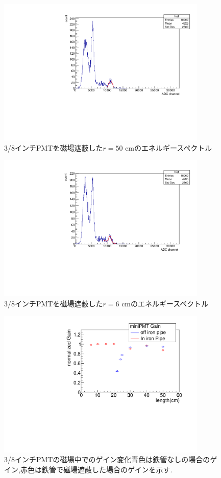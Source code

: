 \begin{figure}[tbp]
	\centering
		\includegraphics[angle=-90,width=10cm]{fig/iguchi/minicoin22.pdf}
	\caption{3/8インチPMTを磁場遮蔽した$r=50$ cmのエネルギースペクトル}
	\label{histminicoin22}
\end{figure}


\begin{figure}[tbp]
	\centering
		\includegraphics[angle=-90,width=10cm]{fig/iguchi/minicoin21.pdf}
	\caption{3/8インチPMTを磁場遮蔽した$r=6$ cmのエネルギースペクトル}
	\label{histminicoin21}
\end{figure}

\begin{figure}[tbp]
	\centering
		\includegraphics[angle=-90,width=10cm]{fig/iguchi/miniPMTgainG.pdf}
	\caption{3/8インチPMTの磁場中でのゲイン変化\newline 青色は鉄管なしの場合のゲイン,赤色は鉄管で磁場遮蔽した場合のゲインを示す.}
	\label{miniPMTgainG}
\end{figure}




